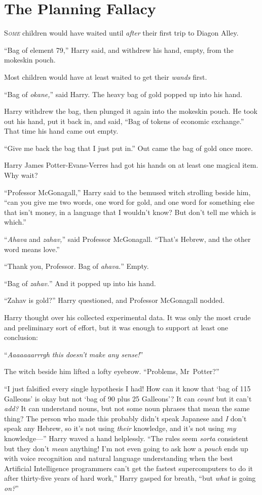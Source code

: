 \chapter{The Planning Fallacy}

\lettrine{S}{\emph{ome}} children would have waited until \emph{after} their first trip to Diagon Alley.

“Bag of element 79,” Harry said, and withdrew his hand, empty, from the mokeskin pouch.

Most children would have at least waited to get their \emph{wands} first.

“Bag of \emph{okane,}” said Harry. The heavy bag of gold popped up into his hand.

Harry withdrew the bag, then plunged it again into the mokeskin pouch. He took out his hand, put it back in, and said, “Bag of tokens of economic exchange.” That time his hand came out empty.

“Give me back the bag that I just put in.” Out came the bag of gold once more.

Harry James Potter-Evans-Verres had got his hands on at least one magical item. Why wait?

“Professor McGonagall,” Harry said to the bemused witch strolling beside him, “can you give me two words, one word for gold, and one word for something else that isn’t money, in a language that I wouldn’t know? But don’t tell me which is which.”

“\emph{Ahava} and \emph{zahav,}” said Professor McGonagall. “That’s Hebrew, and the other word means love.”

“Thank you, Professor. Bag of \emph{ahava.}” Empty.

“Bag of \emph{zahav.}” And it popped up into his hand.

“Zahav is gold?” Harry questioned, and Professor McGonagall nodded.

Harry thought over his collected experimental data. It was only the most crude and preliminary sort of effort, but it was enough to support at least one conclusion:

“\emph{Aaaaaaarrrgh this doesn’t make any sense!}”

The witch beside him lifted a lofty eyebrow. “Problems, Mr~Potter?”

“I just falsified every single hypothesis I had! How can it know that ‘bag of 115 Galleons’ is okay but not ‘bag of 90 plus 25 Galleons’? It can \emph{count} but it can’t \emph{add?} It can understand nouns, but not some noun phrases that mean the same thing? The person who made this probably didn’t speak Japanese and \emph{I} don’t speak any Hebrew, so it’s not using \emph{their} knowledge, and it’s not using \emph{my} knowledge—” Harry waved a hand helplessly. “The rules seem \emph{sorta} consistent but they don’t \emph{mean} anything! I’m not even going to ask how a \emph{pouch} ends up with voice recognition and natural language understanding when the best Artificial Intelligence programmers can’t get the fastest supercomputers to do it after thirty-five years of hard work,” Harry gasped for breath, “but \emph{what} is going \emph{on?}”

